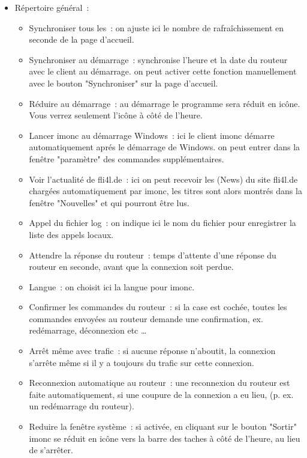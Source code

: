   \begin{itemize}
  \item Répertoire général~:
    \begin{itemize}
    \item Synchroniser tous les~: on ajuste ici le nombre de rafraîchissement
      en seconde de la page d'accueil.
    \item Synchroniser au démarrage~: synchronise l'heure et la date du routeur
      avec le client au démarrage. on peut activer cette fonction manuellement
      avec le bouton "Synchroniser" sur la page d'accueil. 
    \item Réduire au démarrage~: au démarrage le programme sera réduit en icône.
      Vous verrez seulement l'icône à côté de l'heure.
    \item Lancer imonc au démarrage Windows~: ici le client imonc démarre
      automatiquement aprés le démarrage de Windows. on peut entrer dans la
      fenêtre "paramètre" des commandes supplémentaires.
    \item Voir l'actualité de fli4l.de~: ici on peut recevoir les (News) du site
      fli4l.de chargées automatiquement par imonc, les titres sont alors montrés
      dans la fenêtre "Nouvelles" et qui pourront être lus.
    \item Appel du fichier log~: on indique ici le nom du fichier pour
      enregistrer la liste des appels locaux.
    \item Attendre la réponse du routeur~: temps d'attente d'une réponse du
      routeur en seconde, avant que la connexion soit perdue.
    \item Langue~: on choisit ici la langue pour imonc.
    \item Confirmer les commandes du routeur~: si la case est cochée, toutes
      les commandes envoyées au routeur demande une confirmation,
      ex. redémarrage, déconnexion etc \ldots
    \item Arrêt même avec trafic~: si aucune réponse n'aboutit, la connexion
      s'arrête même si il y a toujours du trafic sur cette connexion.
    \item Reconnexion automatique au routeur~: une reconnexion du routeur est
      faite automatiquement, si une coupure de la connexion a eu lieu,
      (p. ex. un redémarrage du routeur).
    \item Reduire la fenêtre système~: si activée, en cliquant sur le bouton
      "Sortir" imonc se réduit en icône vers la barre des taches à côté de
      l'heure, au lieu de s'arrêter.
    \end{itemize}


\end{itemize}
